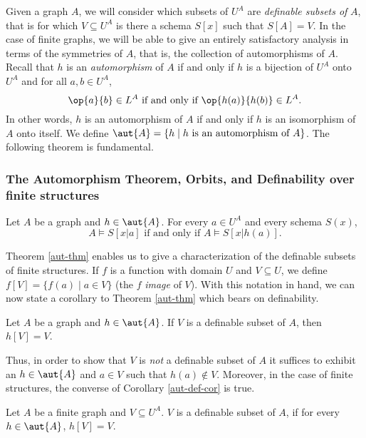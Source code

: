 Given a graph $A$, we will consider which subsets of $U^A$ are \emph{definable subsets of} $A$, that is for which $V\subseteq U^A$ is there a schema $S[x]$ such that $S[A]=V$. In the case of finite graphs, we will be able to give an entirely satisfactory analysis in terms of the symmetries of $A$, that is, the collection of automorphisms of $A$. Recall that $h$ is an \emph{automorphism} of $A$ if and only if $h$ is a bijection of $U^A$ onto $U^A$ and for all $a,b\in U^A$,
\[
\op{a}{b}\in L^A\mbox{ if and only if } \op{h(a)}{h(b)}\in L^A.
\]
In other words, $h$ is an automorphism of $A$ if and only if $h$ is an isomorphism of $A$ onto itself. We define $\aut{A}=\{h\mid h\mbox{ is an automorphism of }A\}$. The following theorem is fundamental.
\fi
\subsubsection{The Automorphism Theorem, Orbits, and Definability over finite structures}
\begin{theorem}\label{aut-thm}
Let $A$ be a graph and $h\in\aut{A}$. For every $a\in U^A$ and every schema $S(x)$,
\[
A\models S[x|a]\mbox{ if and only if }A\models S[x|h(a)]. 
\]
\end{theorem}

Theorem \ref{aut-thm} enables us to give a characterization of the definable subsets of finite structures. 
If $f$ is a function with domain $U$ and $V\subseteq U$, we define $f[V]=\{f(a)\mid a\in V\}$ (the $f$ \emph{image} of $V$). With this notation in hand, we can now state a corollary to Theorem \ref{aut-thm} which bears on definability.
\begin{corollary}\label{aut-def-cor}
Let $A$ be a graph and $h\in\aut{A}$. If $V$ is a definable subset of $A$, then $h[V]=V$.
\end{corollary}
Thus, in order to show that $V$ is \emph{not} a definable subset of $A$ it suffices to exhibit an $h\in\aut{A}$ and $a\in V$ such that $h(a)\not\in V$. Moreover, in the case of finite structures, the converse of Corollary \ref{aut-def-cor} is true.
\begin{theorem}\label{fin-aut-def-thm}
Let $A$ be a finite graph and $V\subseteq U^A$. $V$ is a definable subset of $A$, if for every $h\in\aut{A}$, $h[V]=V$.
\end{theorem}
